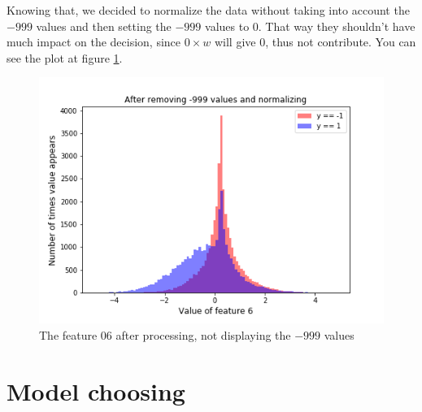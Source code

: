 \documentclass[10pt,conference,compsocconf]{IEEEtran}
\begin{document}
Knowing that, we decided to normalize the data without taking into account the $-999$ values and then setting the $-999$ values to $0$. That way they shouldn't have much impact on the decision, since $0 \times w$ will give 0, thus not contribute. You can see the plot at figure \ref{fig:feature-06-processed}.
\begin{figure}[h!]
	\centering
  \includegraphics[width=\columnwidth]{graph-features/feature-06-processed.png}
  \caption{The feature 06 after processing, not displaying the $-999$ values}
	\label{fig:feature-06-processed}
\end{figure}


\section{Model choosing}
\end{document}
